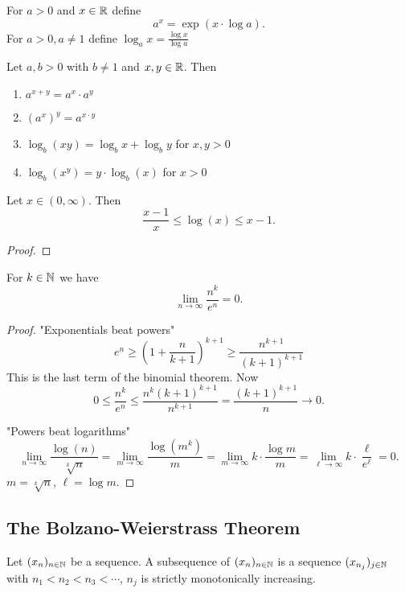 \documentclass[10pt, a4paper]{article}
\newcommand{\seq}[1][x]{(#1_n)_{n \in \N}}
\begin{document}
For $a > 0$ and $x \in \mathbb{R}$ define
\[
a ^ x = \exp(x \cdot \log a).
\]
For $a > 0, a \neq 1$ define $\log_a x = \frac{\log x}{\log a}$

\begin{proposition}
    Let $a, b > 0$ with $b \neq 1$ and $x, y \in \mathbb{R}$.
    Then
    \begin{enumerate}[label = (\alph*)]
        \item $a ^ {x + y} = a ^ x \cdot a ^ y$
        \item $(a ^ x) ^ y = a ^ {x \cdot y}$
        \item $\log_b(xy) = \log_b x + \log_b y$ for $x, y > 0$
        \item $\log_b(x ^ y) = y \cdot \log_b(x)$ for $x > 0$
    \end{enumerate}
\end{proposition}

\begin{lemma}
    Let $x \in (0, \infty)$.
    Then 
    \[
    \frac{x - 1}{x} \leq \log(x) \leq x - 1.
    \]
    \begin{proof}
        
    \end{proof}
\end{lemma}

\begin{example}
    For $k \in \mathbb{N}$ we have
    \[
    \lim_{n \rightarrow \infty}\frac{n ^ k}{e ^ n} = 0.
    \]
    \begin{proof}
        "Exponentials beat powers"
        \[
        e ^ n \geq \left(1 + \frac{n}{k + 1}\right) ^ {k + 1} \geq \frac{n ^ {k + 1}}{(k + 1) ^ {k + 1}}
        \]
        This is the last term of the binomial theorem.
        Now
        \[
        0 \leq \frac{n ^ k}{e ^ n} \leq \frac{n ^ k(k + 1) ^ {k + 1}}{n ^ {k + 1}} = \frac{(k + 1) ^ {k + 1}}{n} \rightarrow 0.
        \]
        
        "Powers beat logarithms"
        \[
        \lim_{n \rightarrow \infty}\frac{\log(n)}{\sqrt[k]{n}} = \lim_{m \rightarrow \infty}\frac{\log(m ^ k)}{m} = \lim_{m \rightarrow \infty}k \cdot \frac{\log m}{m} = \lim_{\ell \rightarrow \infty}k \cdot \frac{\ell}{e ^ \ell} = 0.
        \]
        $m = \sqrt[k]{n}$,
        $\ell = \log m$.
    \end{proof}
\end{example}

\subsection{The Bolzano-Weierstrass Theorem}
\begin{definition}
    Let $\seq$ be a sequence.
    A subsequence of $\seq$ is a sequence $(x_{n_j})_{j \in \mathbb{N}}$ with
    $n_1 < n_2 < n_3 < \dotsi$,
    $n_j$ is strictly monotonically increasing.
\end{definition}
\end{document}
